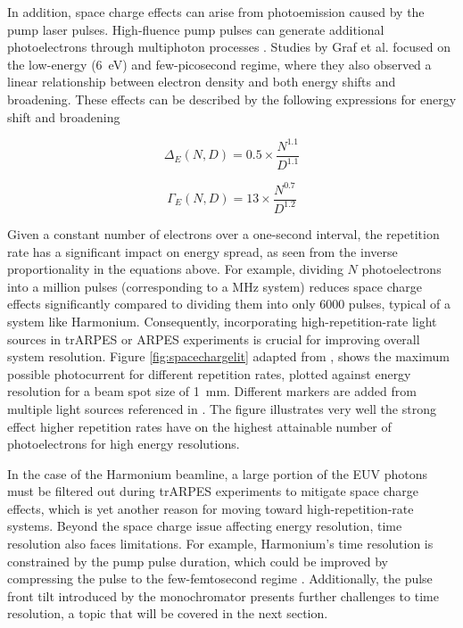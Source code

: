 In addition, space charge effects can arise from photoemission caused by the pump laser pulses.
High-fluence pump pulses can generate additional photoelectrons through multiphoton processes \cite{al-obaidi_ultrafast_2015}.
Studies by Graf et al. \cite{graf_vacuum_2010} focused on the low-energy (\qty{6}{\electronvolt}) and few-picosecond regime, where they also observed a linear relationship between electron density and both energy shifts and broadening.
These effects can be described by the following expressions for energy shift and broadening

\noindent\begin{minipage}{.5\linewidth}
	\begin{equation}
		\Delta_E(N,D)=0.5\times \frac{N^{1.1}}{D^{1.1}}
	\end{equation}
\end{minipage}%
\begin{minipage}{.5\linewidth}
	\begin{equation}
		\Gamma_E(N,D)=13\times \frac{N^{0.7}}{D^{1.2}}
	\end{equation}
\end{minipage}

Given a constant number of electrons over a one-second interval, the repetition rate has a significant impact on energy spread, as seen from the inverse proportionality in the equations above.
For example, dividing $N$ photoelectrons into a million pulses (corresponding to a \unit{\mega\hertz} system) reduces space charge effects significantly compared to dividing them into only 6000 pulses, typical of a system like Harmonium.
Consequently, incorporating high-repetition-rate light sources in trARPES or ARPES experiments is crucial for improving overall system resolution.
Figure \ref{fig:spacechargelit} adapted from \cite{corder_ultrafast_2018}, shows the maximum possible photocurrent for different repetition rates, plotted against energy resolution for a beam spot size of \qty{1}{\milli\meter}.
Different markers are added from multiple light sources referenced in \cite{corder_ultrafast_2018}.
The figure illustrates very well the strong effect higher repetition rates have on the highest attainable number of photoelectrons for high energy resolutions.

In the case of the Harmonium beamline, a large portion of the EUV photons must be filtered out during trARPES experiments to mitigate space charge effects, which is yet another reason for moving toward high-repetition-rate systems.
Beyond the space charge issue affecting energy resolution, time resolution also faces limitations.
For example, Harmonium’s time resolution is constrained by the pump pulse duration, which could be improved by compressing the pulse to the few-femtosecond regime \cite{nisoli_compression_1997}.
Additionally, the pulse front tilt introduced by the monochromator presents further challenges to time resolution, a topic that will be covered in the next section.
	
